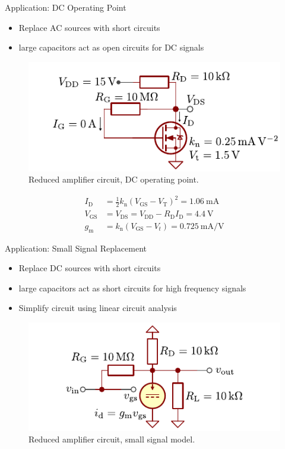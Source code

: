 \begin{frame}{Application: DC Operating Point}
    \begin{itemize}
        \item Replace AC sources with short circuits
        \item large capacitors act as open circuits for DC signals
    \end{itemize}
    \begin{figure}
        \centering
        \includegraphics{../assets/example_circuit_dc.pdf}
        \caption{Reduced amplifier circuit, DC operating point.}
        \label{fig:mosfet_amplifier_dc}
    \end{figure}
    \begin{align*}
        I_{\mathrm{D}}&=\frac{1}{2}k_{\mathrm{n}}(V_{\mathrm{GS}}-V_{\mathrm{T}})^{2} 
        = \qty{1.06}{\milli \ampere}\\
        V_{\mathrm{GS}}&=V_{\mathrm{DS}}=V_{\mathrm{DD}}-R_{\mathrm{D}}I_{\mathrm{D}}
        =\qty{4.4}{\volt} \\
        g_\mathrm{m} &= k_\mathrm{n} (V_\mathrm{GS}-V_t) = \qty{0.725}{\milli \ampere \per \volt}
    \end{align*}
\end{frame}

\begin{frame}{Application: Small Signal Replacement}
    \begin{itemize}
        \item Replace DC sources with short circuits
        \item large capacitors act as short circuits for high frequency signals
        \item Simplify circuit using linear circuit analysis
    \end{itemize}
    \begin{figure}
        \centering
        \includegraphics{../assets/mosfet_amplifier_small_signal.pdf}
        \caption{Reduced amplifier circuit, small signal model.}
        \label{fig:mosfet_amplifier_ac}
    \end{figure}
\end{frame}

